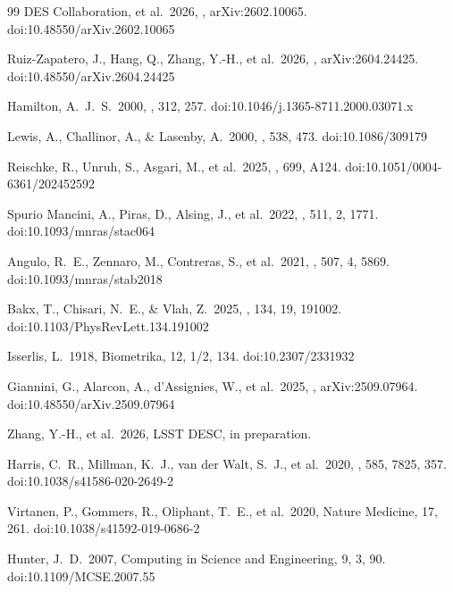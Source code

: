 \documentclass[a4paper, 11pt]{article}
\begin{document}
\begin{thebibliography}{99}
 DES Collaboration, et al.\ 2026, , arXiv:2602.10065. doi:10.48550/arXiv.2602.10065

 Ruiz-Zapatero, J., Hang, Q., Zhang, Y.-H., et al.\ 2026, , arXiv:2604.24425. doi:10.48550/arXiv.2604.24425

 Hamilton, A.~J.~S.\ 2000, \mnras, 312, 257. doi:10.1046/j.1365-8711.2000.03071.x

 Lewis, A., Challinor, A., \& Lasenby, A.\ 2000, \apj, 538, 473. doi:10.1086/309179

 Reischke, R., Unruh, S., Asgari, M., et al.\ 2025, \aap, 699, A124. doi:10.1051/0004-6361/202452592

 Spurio Mancini, A., Piras, D., Alsing, J., et al.\ 2022, \mnras, 511, 2, 1771. doi:10.1093/mnras/stac064

 Angulo, R.~E., Zennaro, M., Contreras, S., et al.\ 2021, \mnras, 507, 4, 5869. doi:10.1093/mnras/stab2018

 Bakx, T., Chisari, N.~E., \& Vlah, Z.\ 2025, \prl, 134, 19, 191002. doi:10.1103/PhysRevLett.134.191002

 Isserlis, L.\ 1918, Biometrika, 12, 1/2, 134. doi:10.2307/2331932

 Giannini, G., Alarcon, A., d'Assignies, W., et al.\ 2025, , arXiv:2509.07964. doi:10.48550/arXiv.2509.07964

 Zhang, Y.-H., et al.\ 2026, LSST DESC, in preparation.

 Harris, C.~R., Millman, K.~J., van der Walt, S.~J., et al.\ 2020, \nat, 585, 7825, 357. doi:10.1038/s41586-020-2649-2

 Virtanen, P., Gommers, R., Oliphant, T.~E., et al.\ 2020, Nature Medicine, 17, 261. doi:10.1038/s41592-019-0686-2

 Hunter, J.~D.\ 2007, Computing in Science and Engineering, 9, 3, 90. doi:10.1109/MCSE.2007.55

\end{thebibliography}
\end{document}
